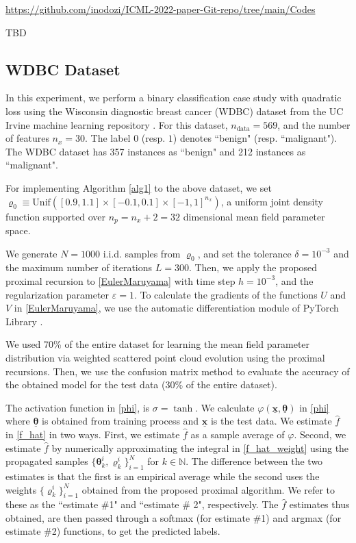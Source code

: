 \documentclass{article}
\newcommand{\bx}{{\bm{x}}}
\begin{document}
\href{https://github.com/inodozi/ICML-2022-paper-Git-repo/tree/main/Codes}{https://github.com/inodozi/ICML-2022-paper-Git-repo/tree/main/Codes}

\color{red}TBD\color{black}
\subsection{WDBC Dataset}\label{subsec.WDBC}
In this experiment, we perform a binary classification case study with quadratic loss using the Wisconsin diagnostic breast cancer (WDBC) dataset from the UC Irvine machine learning repository \cite{Dua:2019}. For this dataset, $n_{\text{data}} = 569$, and the number of features $n_x=30$. The label $0$ (resp. $1$) denotes ``benign" (resp. ``malignant"). The WDBC dataset has 357 instances as ``benign" and 212 instances as ``malignant".

For implementing Algorithm \ref{alg1} to the above dataset, we set $\varrho_{0} \equiv \text{Unif}\left( [0.9, 1.1]\times [-0.1, 0.1] \times [-1,1]^{n_{x}}\right)$, a uniform joint density function supported over $n_{p}=n_{x}+2=32$ dimensional mean field parameter space.

We generate $N=1000$ i.i.d. samples from $\varrho_{0}$, and set the tolerance $\delta=10^{-3}$ and the maximum number of iterations $L=300$. Then, we apply the proposed proximal recursion to \eqref{EulerMaruyama} with time step $h=10^{-3}$, and the regularization parameter $\varepsilon=1$. To calculate the gradients of the functions $U$ and $V$ in \eqref{EulerMaruyama}, we use the automatic differentiation module of PyTorch Library \cite{paszke2017automatic}. 

We used 70\% of the entire dataset for learning the mean field parameter distribution via weighted scattered point cloud evolution using the proximal recursions. Then, we use the confusion matrix method \cite{visa2011confusion} to evaluate the accuracy of the obtained model for the test data ($30 \%$  of the entire dataset).

  The activation function in \eqref{phi}, is  $\sigma=\tanh$. We calculate $\varphi(\underline{\bx},\underline{\bm{\theta}})$ in \eqref{phi} where $\underline{\bm{\theta}}$ is obtained from training process and $\underline{\bx}$ is the test data. We estimate $\widehat{f}$ in \eqref{f_hat} in two ways. First, we estimate $\widehat{f}$ as a sample average of $\varphi$. Second, we estimate $\widehat{f}$ by numerically approximating the integral in \eqref{f_hat_weight} using the propagated samples $\{ \bm{\theta}_{k}^{i},\varrho_{k}^{i}\}_{i=1}^{N}$ for $k\in\mathbb{N}$. The difference between the two estimates is that the first is an empirical average while the second uses the weights $\{\varrho_{k}^{i}\}_{i=1}^{N}$ obtained from the proposed proximal algorithm. We refer to these as the ``estimate \#1" and ``estimate \# 2", respectively. The $\widehat{f}$ estimates thus obtained, are then passed through a softmax (for estimate \#1) and argmax (for estimate \#2) functions, to get the predicted labels. 
\end{document}

